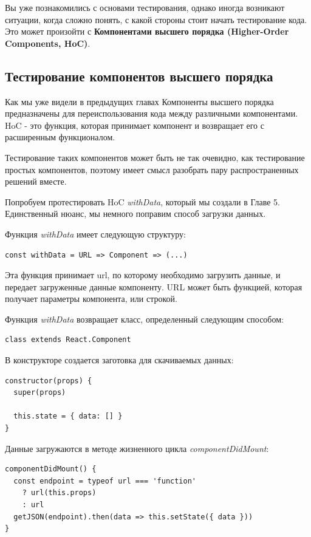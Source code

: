 Вы уже познакомились с основами тестирования, однако иногда возникают ситуации, когда сложно понять, с какой стороны стоит начать тестирование кода. Это может произойти с \textbf{Компонентами высшего порядка (Higher-Order Components, HoC)}.


\subsection{Тестирование компонентов высшего порядка}

Как мы уже видели в предыдущих главах Компоненты высшего порядка предназначены для переиспользования кода между различными компонентами. HoC - это функция, которая принимает компонент и возвращает его с расширенным функционалом.

Тестирование таких компонентов может быть не так очевидно, как тестирование простых компонентов, поэтому имеет смысл разобрать пару распространенных решений вместе.

Попробуем протестировать HoC \textit{withData}, который мы создали в Главе 5. Единственный нюанс, мы немного поправим способ загрузки данных.

Функция \textit{withData} имеет следующую структуру:

\begin{lstlisting}
const withData = URL => Component => (...)
\end{lstlisting}

Эта функция принимает url, по которому необходимо загрузить данные, и передает загруженные данные компоненту. URL может быть функцией, которая получает параметры компонента, или строкой.

Функция \textit{withData} возвращает класс, определенный следующим способом:

\begin{lstlisting}
class extends React.Component
\end{lstlisting}

В конструкторе создается заготовка для скачиваемых данных:

\begin{lstlisting}
constructor(props) {
  super(props)
  
  this.state = { data: [] }
}
\end{lstlisting}

Данные загружаются в методе жизненного цикла \textit{componentDidMount}:

\begin{lstlisting}
componentDidMount() {
  const endpoint = typeof url === 'function'
    ? url(this.props)
    : url
  getJSON(endpoint).then(data => this.setState({ data }))
}
\end{lstlisting}

